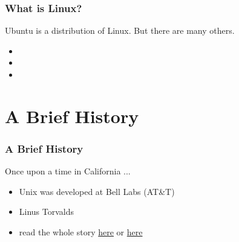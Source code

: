 \documentclass[fleqn]{beamer} %
\newcommand{\sectiontitleI}{What is Linux?} %
\newcommand{\sectiontitleII}{A Brief History}
\begin{document}
	\begin{frame} \small
		\frametitle{\sectiontitleI}
			Ubuntu is a {\B distribution} of Linux. But there are many others. 
            \begin{itemize}
                \item 
                \item 
                \item 
            \end{itemize} 

	\end{frame}
		
\section{\sectiontitleII}	

	\begin{frame}[label=sectionII] \small
		\frametitle{\sectiontitleII}
			Once upon a time in California ...
            \begin{itemize}
                \item Unix was developed at Bell Labs (AT\&T) 
                \item Linus Torvalds   
                \item read the whole story \href{https://en.wikipedia.org/wiki/History_of_Linux}{here} or \href{https://www.bell-labs.com/var/articles/invention-unix/}{here}
            \end{itemize} 

	\end{frame}
		
\end{document}
